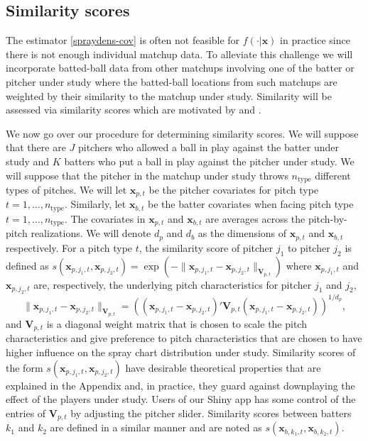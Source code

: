 \documentclass[12pt]{article}
\newcommand{\V}{\textbf{V}}
\newcommand{\x}{\textbf{x}}
\begin{document}
\subsection{Similarity scores}

The estimator \eqref{spraydens-cov} is often not feasible for $f(\cdot|\textbf{x})$ in practice since there is not enough individual matchup data. To alleviate this challenge we will incorporate batted-ball data from other matchups involving one of the batter or pitcher under study where the batted-ball locations from such matchups are weighted by their similarity to the matchup under study. Similarity will be assessed via similarity scores which are motivated by \cite{james1994politics} and \cite{PECOTA}.


We now go over our procedure for determining similarity scores. We will suppose that there are $J$ pitchers who allowed a ball in play against the batter under study and $K$ batters who put a ball in play against the pitcher under study. We will suppose that the pitcher in the matchup under study throws $n_{\text{type}}$ different types of pitches. We will let $\x_{p,t}$ be the pitcher covariates for pitch type $t = 1,\ldots,n_{\text{type}}$. Similarly, let $\x_{b,t}$ be the batter covariates when facing pitch type $t = 1,\ldots,n_{\text{type}}$. The covariates in $\x_{p,t}$ and $\x_{b,t}$ are averages across the pitch-by-pitch realizations. We will denote $d_p$ and $d_b$ as the dimensions of $\x_{p,t}$ and $\x_{b,t}$ respectively. For a pitch type $t$, the similarity score of pitcher $j_1$ to pitcher $j_2$ is defined as $s(\x_{p,j_1,t}, \x_{p,j_2,t}) = \exp(-\|\x_{p,j_1,t}-\x_{p,j_2,t}\|_{\V_{p,t}})$ where $\x_{p,j_1,t}$ and $\x_{p,j_2,t}$ are, respectively, the underlying pitch characteristics for pitcher $j_1$ and $j_2$,
\begin{equation} \label{Vpt}
   \|\x_{p,j_1,t}-\x_{p,j_2,t}\|_{\V_{p,t}}
     = \left((\x_{p,j_1,t}-\x_{p,j_2,t})'\V_{p,t}(\x_{p,j_1,t}-\x_{p,j_2,t})\right)^{1/d_p},
\end{equation}
and $\V_{p,t}$ is a diagonal weight matrix that is chosen to scale the pitch characteristics and give preference to pitch characteristics that are chosen to have higher influence on the spray chart distribution under study. Similarity scores of the form $s(\x_{p,j_1,t}, \x_{p,j_2,t})$ have desirable theoretical properties that are explained in the Appendix and, in practice, they guard against downplaying the effect of the players under study. Users of our Shiny app has some control of the entries of $\V_{p,t}$ by adjusting the pitcher slider. Similarity scores between batters $k_1$ and $k_2$ are defined in a similar manner and are noted as $s(\x_{b,k_1,t}, \x_{b,k_2,t})$.
\end{document}
